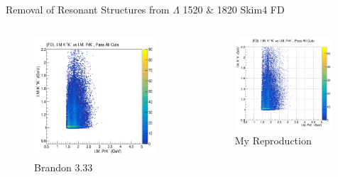 \documentclass[aspectratio=169]{beamer}
\begin{document}
\begin{frame}{Removal of Resonant Structures from $\Lambda$ 1520 \& 1820  \hfill Skim4 FD}
\vspace*{-0.6cm}
    \begin{columns}
    \begin{figure}
        \centering
        \includegraphics[width=0.94\textwidth]{brandon_figs/33.png}
        \caption{Brandon 3.33}
    \end{figure}
    \begin{figure}
        \centering
        \includegraphics[width=0.97\textwidth]{pdfs/33.png}
        \caption{My Reproduction}
    \end{figure}
    \end{columns}
\end{frame}
\end{document}
